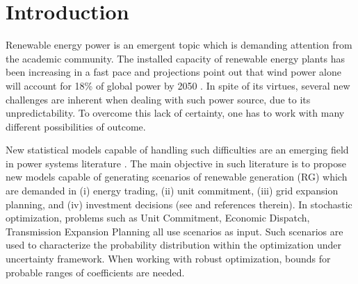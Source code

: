 \chapter{Introduction}


Renewable energy power is an emergent topic which is demanding attention from the academic community. %
The installed capacity of renewable energy plants has been increasing in a fast pace and projections point out that wind power alone will account for 18\% of global power by 2050 \cite{IntEnerAgency}.
In spite of its virtues, several new challenges are inherent when dealing with such power source, due to its unpredictability. To overcome this lack of certainty, one has to work with many different possibilities of outcome.

New statistical models capable of handling such difficulties are an emerging field in power systems literature \cite{bessa2012time, gallego2016line,moller_time-adaptive_2008,nielsen2006,bremnes_probabilistic_2004,wan_direct_2017}. 
The main objective in such literature is to propose new models capable of generating scenarios of renewable generation (RG) which are demanded in (i) energy trading, (ii) unit commitment, (iii) grid expansion planning, and (iv) investment decisions (see \cite{moreiraStreet,jabr2013robust,zhaoguan,Aderson2017} and references therein). 
In stochastic optimization, problems such as Unit Commitment, Economic Dispatch, Transmission Expansion Planning all use scenarios as input. 
Such scenarios are used to characterize the probability distribution within the optimization under uncertainty framework.
When working with robust optimization, bounds for probable ranges of coefficients are needed.

 
